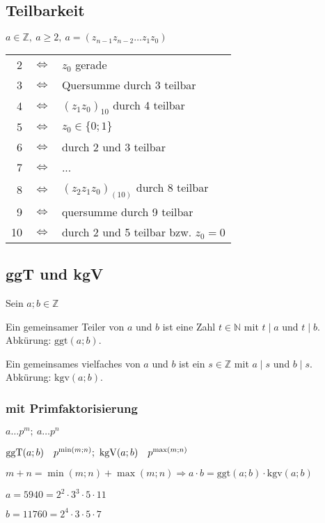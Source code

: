 \subsection{Teilbarkeit}
$a \in \mathbb{Z},\ a \geq 2,\ a=(z_{n-1}z_{n-2} \dots z_1z_0)$ \\
\begin{tabular}{rcl}
    2  & $\Leftrightarrow$ & $z_0$ gerade                         \\
    3  & $\Leftrightarrow$ & Quersumme durch 3 teilbar            \\
    4  & $\Leftrightarrow$ & $(z_1z_0)_{10}$ durch 4 teilbar      \\
    5  & $\Leftrightarrow$ & $z_0 \in \lbrace 0; 1 \rbrace$       \\
    6  & $\Leftrightarrow$ & durch 2 und 3 teilbar                \\
    7  & $\Leftrightarrow$ & ...                                  \\
    8  & $\Leftrightarrow$ & $(z_2z_1z_0)_{(10)}$ durch 8 teilbar \\
    9  & $\Leftrightarrow$ & quersumme durch 9 teilbar            \\
    10 & $\Leftrightarrow$ & durch 2 und 5 teilbar bzw. $z_0=0$
\end{tabular}
\subsection{ggT und kgV}
Sein $a;b \in \mathbb{Z}$

Ein gemeinsamer Teiler von $a$ und $b$ ist eine Zahl $t \in \mathbb{N}$ mit $t \mid a$ und $t \mid b$. Abkürung: $\textrm{ggt}(a;b)$.

Ein gemeinsames vielfaches von $a$ und $b$ ist ein $s \in \mathbb{Z}$ mit $a \mid s$ und $b \mid s$. Abkürung: $\textrm{kgv}(a;b)$.

\subsubsection{mit Primfaktorisierung}
$a \dots p^m;\ a \dots p^n$

$\ggt(a;b)\quad p^{\min(m;n)};\ \kgv(a;b)\quad p^{\max(m;n)}$

$m + n = \min(m;n) + \max(m;n) \Rightarrow a \cdot b = \textrm{ggt}(a;b) \cdot \textrm{kgv}(a;b)$

$a = 5940 = 2^2 \cdot 3^3 \cdot 5 \cdot 11$

$b = 11760 = 2^4 \cdot 3 \cdot 5 \cdot 7$

